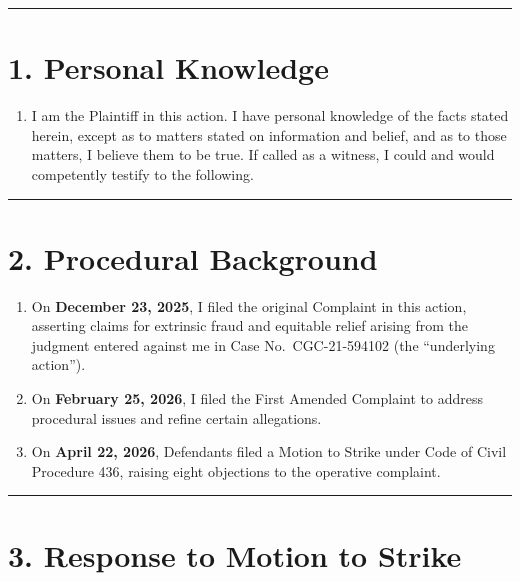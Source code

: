 \begin{center}\rule{0.5\linewidth}{0.5pt}\end{center}

\section{1. Personal Knowledge}\label{personal-knowledge}

\begin{enumerate}
\def\labelenumi{\arabic{enumi}.}
\tightlist
\item
  I am the Plaintiff in this action. I have personal knowledge of the facts stated herein, except as to matters stated on information and belief, and as to those matters, I believe them to be true. If called as a witness, I could and would competently testify to the following.
\end{enumerate}

\begin{center}\rule{0.5\linewidth}{0.5pt}\end{center}

\section{2. Procedural Background}\label{procedural-background}

\begin{enumerate}
\def\labelenumi{\arabic{enumi}.}
\setcounter{enumi}{1}
\item
  On \textbf{December 23, 2025}, I filed the original Complaint in this action, asserting claims for extrinsic fraud and equitable relief arising from the judgment entered against me in Case No.~CGC-21-594102 (the ``underlying action'').
\item
  On \textbf{February 25, 2026}, I filed the First Amended Complaint to address procedural issues and refine certain allegations.
\item
  On \textbf{April 22, 2026}, Defendants filed a Motion to Strike under Code of Civil Procedure \textsection{} 436, raising eight objections to the operative complaint.
\end{enumerate}

\begin{center}\rule{0.5\linewidth}{0.5pt}\end{center}

\section{3. Response to Motion to Strike}\label{response-to-motion-to-strike}

